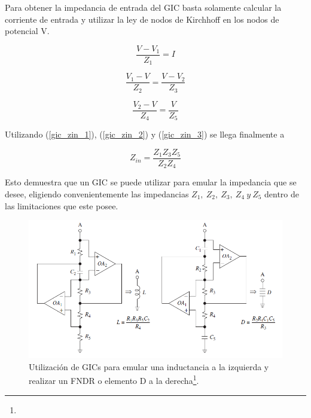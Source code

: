 
Para obtener la impedancia de entrada del GIC basta solamente calcular la corriente de entrada y utilizar la ley de nodos de Kirchhoff en los nodos de potencial V.

\begin{equation}
\frac{V-V_1}{Z_1}=I
\label{gic_zin_1}
\end{equation}

\begin{equation}
\frac{V_1-V}{Z_2} = \frac{V-V_2}{Z_3}
\label{gic_zin_2}
\end{equation}

\begin{equation}
\frac{V_2-V}{Z_4} = \frac{V}{Z_5}
\label{gic_zin_3}
\end{equation}

Utilizando (\ref{gic_zin_1}), (\ref{gic_zin_2}) y (\ref{gic_zin_3}) se llega finalmente a

\begin{equation}
Z_{in} = \frac{Z_1 Z_3 Z_5}{Z_2 Z_4}
\label{grounded_gic_zin}
\end{equation}

Esto demuestra que un GIC se puede utilizar para emular la impedancia que se desee, eligiendo convenientemente las impedancias $Z_1, \ Z_2, \ Z_3, \ Z_4 \ y \ Z_5$ dentro de las limitaciones que este posee.

\begin{figure}[H]
	\centering
	\includegraphics[width=1\textwidth]{Imagenes/gic_ind_fndr.PNG}
	\caption[]{Utilización de GICs para emular una inductancia a la izquierda y realizar un FNDR o elemento D a la derecha\protect\footnote{}.}
	\label{fig:gic_ind_fndr}
\end{figure}

